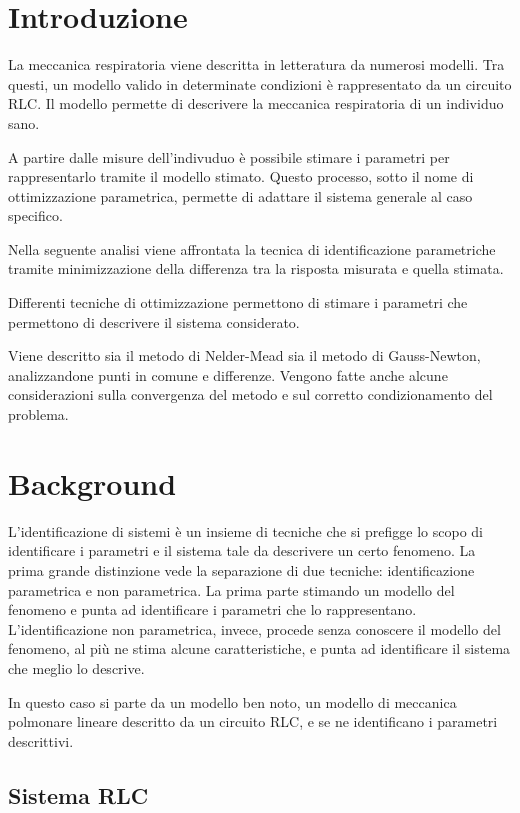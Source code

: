 \section{Introduzione}

La meccanica respiratoria viene descritta in letteratura da numerosi modelli. Tra questi, un modello valido in determinate condizioni è rappresentato da un circuito RLC. Il modello permette di descrivere la meccanica respiratoria di un individuo sano. 

A partire dalle misure dell'indivuduo è possibile stimare i parametri per rappresentarlo tramite il modello stimato. Questo processo, sotto il nome di ottimizzazione parametrica, permette di adattare il sistema generale al caso specifico.

Nella seguente analisi viene affrontata la tecnica di identificazione parametriche tramite minimizzazione della differenza tra la risposta misurata e quella stimata.

Differenti tecniche di ottimizzazione permettono di stimare i parametri che permettono di descrivere il sistema considerato. 

Viene descritto sia il metodo di Nelder-Mead sia il metodo di Gauss-Newton, analizzandone punti in comune e differenze. Vengono fatte anche alcune considerazioni sulla convergenza del metodo e sul corretto condizionamento del problema.

\section{Background}

L'identificazione di sistemi è un insieme di tecniche che si prefigge lo scopo di identificare i parametri e il sistema tale da descrivere un certo fenomeno. La prima grande distinzione vede la separazione di due tecniche: identificazione parametrica e non parametrica. La prima parte stimando un modello del fenomeno e punta ad identificare i parametri che lo rappresentano. L'identificazione non parametrica, invece, procede senza conoscere il modello del fenomeno, al più ne stima alcune caratteristiche, e punta ad identificare il sistema che meglio lo descrive.

In questo caso si parte da un modello ben noto, un modello di meccanica polmonare lineare descritto da un circuito RLC, e se ne identificano i parametri descrittivi.

\subsection{Sistema RLC}

